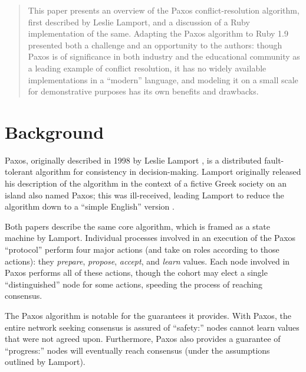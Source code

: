 \documentclass{acm_proc_article-sp}
\begin{document}
\maketitle
\begin{abstract}

This paper presents an overview of the Paxos conflict-resolution algorithm,
first described by Leslie Lamport, and a discussion of a Ruby implementation of
the same. Adapting the Paxos algorithm to Ruby 1.9 presented both a challenge
and an opportunity to the authors: though Paxos is of significance in both
industry and the educational community as a leading example of conflict
resolution, it has no widely available implementations in a ``modern''
language, and modeling it on a small scale for demonstrative purposes has its
own benefits and drawbacks.

\end{abstract}




\section{Background}

Paxos, originally described in 1998 by Leslie Lamport \cite{paxos}, is a
distributed fault-tolerant algorithm for consistency in decision-making. Lamport
originally released his description of the algorithm in the context of a fictive
Greek society on an island also named Paxos; this was ill-received, leading
Lamport to reduce the algorithm down to a ``simple English'' version
\cite{simple-paxos}.

Both papers describe the same core algorithm, which is framed as a state machine
by Lamport. Individual processes involved in an execution of the Paxos
``protocol'' perform four major actions (and take on roles according to those
actions): they \textit{prepare}, \textit{propose}, \textit{accept}, and
\textit{learn} values. Each node involved in Paxos performs all of these
actions, though the cohort may elect a single ``distinguished'' node for some
actions, speeding the process of reaching consensus.

The Paxos algorithm is notable for the guarantees it provides. With Paxos, the
entire network seeking consensus is assured of ``safety:'' nodes cannot learn
values that were not agreed upon. Furthermore, Paxos also provides a guarantee
of ``progress:'' nodes will eventually reach consensus (under the assumptions
outlined by Lamport).
\end{document}
